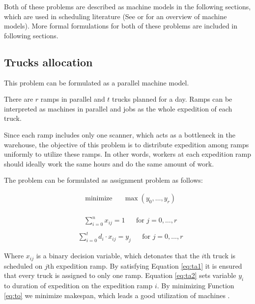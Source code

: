\documentclass{ctuthesis}
\begin{document}
Both of these problems are described as machine models in the following sections, which are used in scheduling literature (See \cite{pinedo} or \cite{bucker} for an overview of machine models). More formal formulations for both of these problems are included in following sections.
 
 \subsection{Trucks allocation}
 \label{subsec:truckallocation}
This problem can be formulated as a parallel machine model.
 
 There are $r$ ramps in parallel and $t$ trucks planned for a day. Ramps can be interpreted as machines in parallel and jobs as the whole expedition of each truck. 
 
 Since each ramp includes only one scanner, which acts as a bottleneck in the warehouse, the objective of this problem is to distribute expedition among ramps uniformly to utilize these ramps. In other words, workers at each expedition ramp should ideally work the same hours and do the same amount of work. 
 

  The problem can be formulated as assignment problem as follows:
 
 \begin{equation}\label{eq:to}
\begin{aligned}
&\text{minimize}
&&\max(y_0, \ldots, y_r)
\end{aligned}
\end{equation}
\\
\begin{equation} \label{eq:ta1}
\begin{aligned}
    & \sum_{i=0}^{n} x_{ij} = 1 && \text{for } j=0, \ldots, r\\
\end{aligned}
\end{equation}
\begin{equation} \label{eq:ta2}
\begin{aligned}
    & \sum_{i=0}^{t} {d_i} \cdot x_{ij} = y_j && \text{for } j=0, \ldots, r
\end{aligned}
\end{equation}
  
Where $x_{ij}$ is a binary decision variable, which detonates that the $i$th truck is scheduled on $j$th expedition ramp. By satisfying Equation \ref{eq:ta1} it is ensured that every truck is assigned to only one ramp. Equation \ref{eq:ta2} sets variable $y_i$ to duration of expedition on the expedition ramp $i$. By minimizing Function \ref{eq:to} we minimize makespan, which leads a good utilization of machines \cite{pinedo}.
\end{document}
